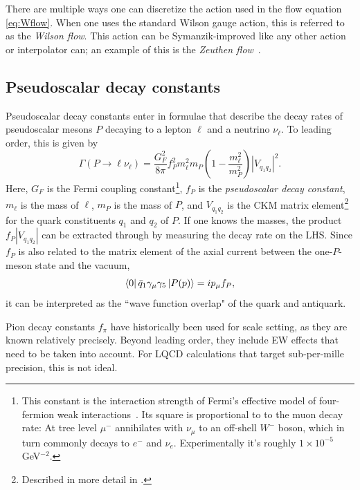 There are multiple ways one can discretize the action used in the flow equation
\eqref{eq:Wflow}. When one uses the standard Wilson gauge action, this is referred
to as the {\it Wilson flow}. This action can be 
Symanzik-improved like any other action or interpolator can; an example of this is 
the {\it Zeuthen flow}~\cite{Ramos:2015baa}.

\subsection{Pseudoscalar decay constants}

Pseudoscalar decay constants enter in formulae that describe the decay rates 
of pseudoscalar mesons $P$ decaying to a lepton $\ell$ and a neutrino $\nu_\ell$. 
To leading order, this is given by
\begin{equation}\label{eq:decayconstant}
\Gamma(P\to\ell\nu_\ell)=\frac{G_F^2}{8\pi}f_P^2m_\ell^2m_P
\left(1-\frac{m_\ell^2}{m_P^2}\right)|V_{q_1q_2}|^2.
\end{equation}
Here, $G_F$ is the Fermi coupling constant\footnote{This constant is the
interaction strength of Fermi's effective model of four-fermion weak
interactions~\cite{fermi_tentativo_1934}. Its square is proportional to
to the muon decay rate: At tree level $\mu^-$ annihilates with $\nu_\mu$
to an off-shell $W^-$ boson, which in turn commonly decays to
$e^-$ and $\nu_e$. Experimentally it's roughly $1\times10^{-5}$ GeV$^{-2}$.},
$f_P$ is the {\it pseudoscalar decay constant},
$m_\ell$ is the mass of $\ell$, $m_P$ is the mass of $P$,
and $V_{q_1q_2}$ is the CKM matrix element\footnote{Described in
more detail in .} for the quark constituents
$q_1$ and $q_2$ of $P$. If one knows the masses, the product
$f_P|V_{q_1q_2}|$ can be extracted through  by
measuring the decay rate on the LHS.
Since $f_P$ is also related to the matrix element of the
axial current between the one-$P$-meson state and the vacuum,
\begin{equation}
\bra{0}\bar{q}_1\gamma_\mu\gamma_5\ket{P(p)}=ip_\mu f_P,
\end{equation}
it can be interpreted as the ``wave function overlap" of the quark and
antiquark. 

Pion decay constants $f_\pi$ have historically been used for scale setting, as
they are known relatively precisely. Beyond leading order, they include
EW effects that need to be taken into account. For LQCD calculations
that target sub-per-mille precision, this is not ideal.

